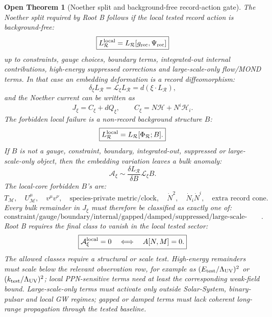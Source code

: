 \documentclass[11pt]{article}
\newtheorem{openthm}{Open Theorem}
\begin{document}
\begin{openthm}[Noether split and background-free record-action gate]
The Noether split required by Root B follows if the local tested record action
is background-free:
\[
\boxed{
L_{\mathcal R}^{\rm local}
=
L_{\mathcal R}[g_{\rm rec},\Psi_{\rm rec}]
}
\]
up to constraints, gauge choices, boundary terms, integrated-out internal
contributions, high-energy suppressed corrections and large-scale-only
flow/MOND terms.  In that case an embedding deformation is a record
diffeomorphism:
\[
\boxed{
\delta_\xi L_{\mathcal R}
=
\mathcal L_\xi L_{\mathcal R}
=
d(\xi\cdot L_{\mathcal R}),
}
\]
and the Noether current can be written as
\[
\boxed{
J_\xi=C_\xi+dQ_\xi,
\qquad
C_\xi=N\mathcal H+N^i\mathcal H_i.
}
\]
The forbidden local failure is a non-record background structure \(B\):
\[
\boxed{
L_{\mathcal R}^{\rm local}
=
L_{\mathcal R}[\Phi_{\mathcal R};B].
}
\]
If \(B\) is not a gauge, constraint, boundary, integrated-out, suppressed or
large-scale-only object, then the embedding variation leaves a bulk anomaly:
\[
\boxed{
\mathcal A_\xi
\sim
\frac{\delta L_{\mathcal R}}{\delta B}\mathcal L_\xi B.
}
\]
The local-core forbidden \(B\)'s are:
\[
\boxed{
T_{\mathcal M},\quad
U^\mu_{\mathcal M},\quad
v^\mu v^\nu,\quad
\text{species-private metric/clock},\quad
\dot N^2,\quad
\dot N_i\dot N^i,\quad
\text{extra record cone}.
}
\]
Every bulk remainder in \(J_\xi\) must therefore be classified as exactly one
of:
\[
\boxed{
\text{constraint/gauge/boundary/internal/gapped/damped/suppressed/large-scale-only/anomaly}.
}
\]
Root B requires the final class to vanish in the local tested sector:
\[
\boxed{
\mathcal A_\xi^{\rm local}=0
\quad\Longleftrightarrow\quad
A[N,M]=0.
}
\]
The allowed classes require a structural or scale test.  High-energy
remainders must scale below the relevant observation row, for example as
\((E_{\rm test}/\Lambda_{\rm UV})^2\) or
\((k_{\rm test}/\Lambda_{\rm UV})^2\); local PPN-sensitive terms need at least
the corresponding weak-field bound.  Large-scale-only terms must activate only
outside Solar-System, binary-pulsar and local GW regimes; gapped or damped
terms must lack coherent long-range propagation through the tested baseline.
\end{openthm}
\end{document}
